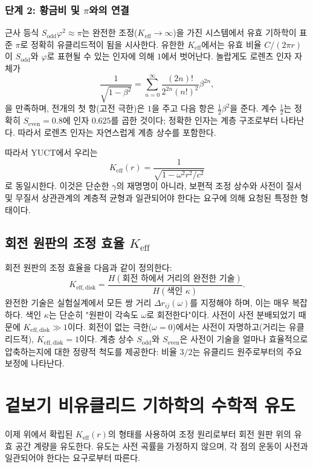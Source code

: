 \documentclass[12pt,a4paper]{article}
\newcommand{\Sodd}{S_{\mathrm{odd}}}
\newcommand{\Seven}{S_{\mathrm{even}}}
\begin{document}
	\subsubsection{단계 2: 황금비 및 \(\pi\)와의 연결}
	근사 등식 \(\Sodd \varphi^2 \approx \pi\)는 완전한 조정(\(K_{\mathrm{eff}} \to \infty\))을 가진 시스템에서 유효 기하학이 표준 \(\pi\)로 정확히 유클리드적이 됨을 시사한다. 유한한 \(K_{\mathrm{eff}}\)에서는 유효 비율 \(C/(2\pi r)\)이 \(\Sodd\)와 \(\varphi\)로 표현될 수 있는 인자에 의해 \(1\)에서 벗어난다. 놀랍게도 로렌츠 인자 자체가
	\[
	\frac{1}{\sqrt{1-\beta^2}} = \sum_{n=0}^{\infty} \frac{(2n)!}{2^{2n}(n!)^2} \beta^{2n},
	\]
	을 만족하며, 전개의 첫 항(고전 극한)은 \(1\)을 주고 다음 항은 \(\frac{1}{2}\beta^2\)을 준다. 계수 \(\frac{1}{2}\)는 정확히 \(\Seven = 0.8\)에 인자 \(0.625\)를 곱한 것이다; 정확한 인자는 계층 구조로부터 나타난다. 따라서 로렌츠 인자는 자연스럽게 계층 상수를 포함한다.
	
	따라서 YUCT에서 우리는
	\[
	\boxed{K_{\mathrm{eff}}(r) = \frac{1}{\sqrt{1 - \omega^2 r^2/c^2}}}
	\]
	로 동일시한다. 이것은 단순한 \(\gamma\)의 재명명이 아니라, 보편적 조정 상수와 사전이 질서 및 무질서 상관관계의 계층적 균형과 일관되어야 한다는 요구에 의해 요청된 특정한 형태이다.
	
	\subsection{회전 원판의 조정 효율 \(K_{\mathrm{eff}}\)}
	\label{subsec:keff-disk}
	
	회전 원판의 조정 효율을 다음과 같이 정의한다:
	\[
	K_{\mathrm{eff,disk}} = \frac{H(\text{회전 하에서 거리의 완전한 기술})}{H(\text{색인 } \kappa)}.
	\]
	완전한 기술은 실험실계에서 모든 쌍 거리 \(\Delta r_{ij}(\omega)\)를 지정해야 하며, 이는 매우 복잡하다. 색인 \(\kappa\)는 단순히 "원판이 각속도 \(\omega\)로 회전한다"이다. 사전이 사전 분배되었기 때문에 \(K_{\mathrm{eff,disk}} \gg 1\)이다. 회전이 없는 극한(\(\omega = 0\))에서는 사전이 자명하고(거리는 유클리드적), \(K_{\mathrm{eff,disk}} = 1\)이다. 계층 상수 \(\Sodd\)와 \(\Seven\)은 사전이 기술을 얼마나 효율적으로 압축하는지에 대한 정량적 척도를 제공한다: 비율 \(3/2\)는 유클리드 원주로부터의 주요 보정에 나타난다.
	
	\section{겉보기 비유클리드 기하학의 수학적 유도}
	\label{sec:derivation}
	
	이제 위에서 확립된 \(K_{\mathrm{eff}}(r)\)의 형태를 사용하여 조정 원리로부터 회전 원판 위의 유효 공간 계량을 유도한다. 유도는 사전 곡률을 가정하지 않으며, 각 점의 운동이 사전과 일관되어야 한다는 요구로부터 따른다.
	
\end{document}
